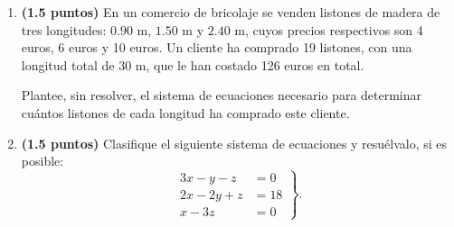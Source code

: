
\begin{enumerate}[label=\alph*)]
\item \textbf{(1.5 puntos)} En un comercio de bricolaje se venden listones de madera de tres longitudes: $0.90$ m, $1.50$ m y $2.40$ m, cuyos precios respectivos son 4 euros, 6 euros y 10 euros. Un cliente ha comprado 19 listones, con una longitud total de 30 m, que le han costado 126 euros en total.

Plantee, sin resolver, el sistema de ecuaciones necesario para determinar cuántos listones de cada longitud ha comprado este cliente.
\item \textbf{(1.5 puntos)} Clasifique el siguiente sistema de ecuaciones y resuélvalo, si es posible:
\[
\left.\begin{aligned}3x-y-z&=0\\2x-2y+z&=18\\x-3z&=0\end{aligned}\right\}.
\]
\end{enumerate}

